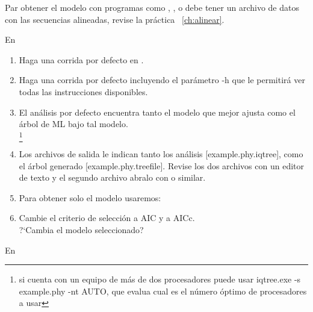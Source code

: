 Par obtener el modelo con programas como  , ,  o  debe tener un archivo de datos con las secuencias alineadas, revise la pr\'actica ~\ref{ch:alinear}. 



En 


	\begin{enumerate}
	
		\item Haga una corrida por defecto en .\\
		
		\item Haga una corrida por defecto incluyendo el par\'ametro -h que le permitir\'a ver todas las instrucciones disponibles.\\
		
		\item  El an\'alisis por defecto encuentra tanto el modelo que mejor ajusta como el \'arbol de ML bajo tal modelo.\\
		\footnote{si cuenta con un equipo de m\'as de dos procesadores puede usar  iqtree.exe -s example.phy -nt AUTO, que evalua cual es el número \'optimo de procesadores a usar }

		\item  Los archivos de salida le indican tanto los an\'alisis [example.phy.iqtree], como el \'arbol generado [example.phy.treefile]. Revise los dos archivos con un editor de texto y el segundo archivo abralo con  o similar.
		
		\item  Para obtener solo el modelo usaremos:\\

		
		\item  Cambie el criterio de selecci\'on a AIC y a AICc.\\
		
		?`Cambia el modelo seleccionado?

		
		
	\end{enumerate}



En 


